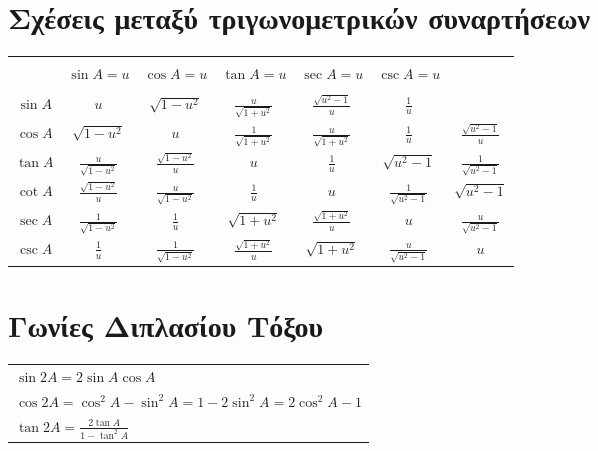 \section{Σχέσεις μεταξύ τριγωνομετρικών συναρτήσεων}

\begin{center}
    \begin{tabular}{*{7}c}
        \toprule \\
    & $ \sin{A} = u $ & $ \cos{A} = u $ & $ \tan{A} = u $ & $ \sec{A} = u $ & $
    \csc{A} = u $ \\
    \midrule \\
        $ \sin{A} $ & $ u $ & $ \sqrt{1-u^{2}} $ & $ \frac{u}{\sqrt{1 + u^{2}}
    }$ & $ \frac{\sqrt{u^{2}-1} }{u} $ & $ \frac{1}{u} $ \\ 
        $ \cos{A} $ & $ \sqrt{1-u^{2}} $ & $ u $ & $ \frac{1}{\sqrt{1 + u^{2}}}
        $ & $ \frac{u}{\sqrt{1 + u^{2}}} $ & $ \frac{1}{u} $ & $
        \frac{\sqrt{u^{2}-1}}{u} $ \\  
        $ \tan{A} $ & $ \frac{u}{ \sqrt{1-u^{2}}} $ & $ \frac{ \sqrt{1-u^{2}}}{
        u} $ & $ u $ & $ \frac{1}{u} $ & $ \sqrt{u^{2}-1} $ & $
        \frac{1}{\sqrt{u^{2}-1}} $ \\
        $ \cot{A} $ & $ \frac{ \sqrt{1-u^{2}}}{u} $ & $ \frac{u}{
    \sqrt{1-u^{2}}} $ & $ \frac{1}{u} $ & $ u $ & $ \frac{1}{\sqrt{u^{2}-1}} $ & $
    \sqrt{u^{2}-1} $ \\
        $ \sec{A} $ & $ \frac{1}{ \sqrt{1-u^{2}}} $ & $ \frac{1}{u} $ & 
        $\sqrt{1 + u^{2}} $ & $ \frac{\sqrt{1 + u^{2}}}{u} $ & $ u $ & 
            $ \frac{u}{\sqrt{u^{2}-1}} $ \\
        $ \csc{A} $ & $ \frac{1}{u} $ & $ \frac{1}{\sqrt{1-u^{2}}} $ &
        $ \frac{\sqrt{1 + u^{2}}}{u} $ & $\sqrt{1 + u^{2}}$ &
        $ \frac{u}{\sqrt{u^{2}-1}} $ & $ u $ \\
        \bottomrule
    \end{tabular}
\end{center}


\section {Γωνίες Διπλασίου Τόξου}

\begin{tabular}{l}
    $ \sin{2A} = 2 \sin{A} \cos{A} $ \\
    $ \cos{2A} = \cos^{2}{A} - \sin^{2}{A} = 1 - 2 \sin^{2}{A} = 2
    \cos^{2}{A} -1 $ \\
    $ \tan{2A} = \frac{2 \tan{A}}{1 - \tan^{2}{A}} $ 
\end{tabular}

